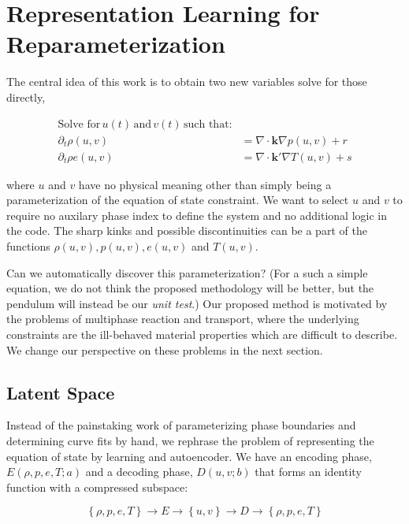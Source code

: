 \documentclass[]{article}
\begin{document}
\hypertarget{header-n3294}{%
\section{Representation Learning for
Reparameterization}\label{header-n3294}}

The central idea of this work is to obtain two new variables solve for
those directly,

\begin{align}
\text{Solve for}\, u(t)\, \text{and}\, v(t)\, \text{such that:}\\
\partial_t \rho(u,v) & = \nabla \cdot \mathbf{k} \nabla p(u,v) + r \\
\partial_t \rho e(u,v) & = \nabla \cdot \mathbf{k'}\nabla T(u,v) + s
\end{align}

where \(u\) and \(v\) have no physical meaning other than simply being a
parameterization of the equation of state constraint. We want to select
\(u\) and \(v\) to require no auxilary phase index to define the system
and no additional logic in the code. The sharp kinks and possible
discontinuities can be a part of the functions
\(\rho(u,v), p(u,v), e(u,v)\) and \(T(u,v)\).

Can we automatically discover this parameterization? (For a such a
simple equation, we do not think the proposed methodology will be
better, but the pendulum will instead be our \emph{unit test}.) Our
proposed method is motivated by the problems of multiphase reaction and
transport, where the underlying constraints are the ill-behaved material
properties which are difficult to describe. We change our perspective on
these problems in the next section.

\hypertarget{header-n3299}{%
\subsection{Latent Space}\label{header-n3299}}

Instead of the painstaking work of parameterizing phase boundaries and
determining curve fits by hand, we rephrase the problem of representing
the equation of state by learning and autoencoder. We have an encoding
phase, \(E(\rho,p,e,T; a)\) and a decoding phase, \(D(u,v; b)\) that
forms an identity function with a compressed subspace:

\begin{equation}
\left\{ \rho, p, e, T \right\} \rightarrow  E \rightarrow \left\{ u,v \right\} \rightarrow D \rightarrow \left\{ \rho, p, e, T \right\}
\end{equation}
\end{document}
